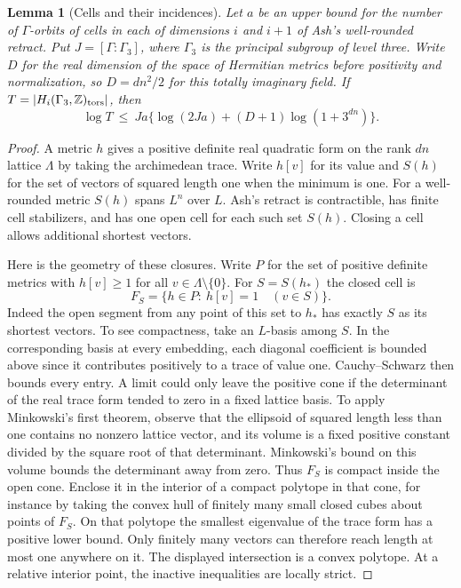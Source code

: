 \documentclass[a4paper,11pt]{article}
\newtheorem{lemma}[proposition]{Lemma}
\theoremstyle{definition}
\theoremstyle{remark}
\newcommand{\ZZ}{\mathbb Z}\newcommand{\ord}{\operatorname{ord}}
\numberwithin{equation}{section}
\begin{document}
\begin{lemma}[Cells and their incidences]\label{lem:inc103}
Let \(a\) be an upper bound for the number of \(\Gamma\)-orbits of
cells in each of dimensions \(i\) and \(i+1\) of Ash's well-rounded
retract. Put \(J=[\Gamma:\Gamma_3]\), where \(\Gamma_3\) is the
principal subgroup of level three. Write \(D\) for the real
dimension of the space of Hermitian metrics before positivity and
normalization, so \(D=dn^2/2\) for this totally imaginary field.
If \(T=|H_i(\Gamma_3,\ZZ)_{\rm tors}|\), then
\[
 \log T\ \le\ J a\big\{\log(2Ja)+(D+1)\log(1+3^{dn})\big\}.
\]
\end{lemma}
\begin{proof}
A metric \(h\) gives a positive definite real quadratic form on the
rank \(dn\) lattice \(\Lambda\) by taking the archimedean trace.
Write \(h[v]\) for its value and \(S(h)\) for the set of vectors
of squared length one when the minimum is one. For a well-rounded
metric \(S(h)\) spans \(L^n\) over \(L\). Ash's retract is
contractible, has finite cell stabilizers, and has one open cell
for each such set \(S(h)\). Closing a cell allows additional
shortest vectors.~\cite[Sec.~2.3]{IV-II-III-beh}

Here is the geometry of these closures. Write \(P\) for the set of
positive definite metrics with \(h[v]\ge1\) for all
\(v\in\Lambda\setminus\{0\}\). For \(S=S(h_*)\) the closed cell is
\[
                 F_S=\{h\in P:\ h[v]=1\quad(v\in S)\}.
\]
Indeed the open segment from any point of this set to \(h_*\) has
exactly \(S\) as its shortest vectors. To see compactness, take an
\(L\)-basis among \(S\). In the corresponding basis at every
embedding, each diagonal coefficient is bounded above since it
contributes positively to a trace of value one. Cauchy--Schwarz
then bounds every entry. A limit could only leave the positive
cone if the determinant of the real trace form tended to zero in
a fixed lattice basis. To apply Minkowski's first theorem, observe
that the ellipsoid of squared length less than one contains no nonzero
lattice vector, and its volume is a fixed positive constant
divided by the square root of that determinant. Minkowski's bound
on this volume bounds the determinant away from zero. Thus \(F_S\) is
compact inside the open cone. Enclose it in the interior of a
compact polytope in that cone, for instance by taking the convex
hull of finitely many small closed cubes about points of \(F_S\).
On that polytope the smallest eigenvalue of the trace form has a
positive lower bound. Only finitely many vectors can therefore
reach length at most one anywhere on it. The displayed intersection
is a convex polytope. At a relative interior point, the inactive
inequalities are locally strict.


\end{proof}
\end{document}
